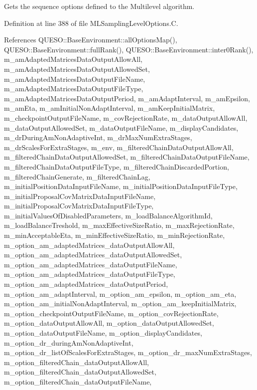 Gets the sequence options defined to the Multilevel algorithm. 



Definition at line 388 of file M\-L\-Sampling\-Level\-Options.\-C.



References Q\-U\-E\-S\-O\-::\-Base\-Environment\-::all\-Options\-Map(), Q\-U\-E\-S\-O\-::\-Base\-Environment\-::full\-Rank(), Q\-U\-E\-S\-O\-::\-Base\-Environment\-::inter0\-Rank(), m\-\_\-am\-Adapted\-Matrices\-Data\-Output\-Allow\-All, m\-\_\-am\-Adapted\-Matrices\-Data\-Output\-Allowed\-Set, m\-\_\-am\-Adapted\-Matrices\-Data\-Output\-File\-Name, m\-\_\-am\-Adapted\-Matrices\-Data\-Output\-File\-Type, m\-\_\-am\-Adapted\-Matrices\-Data\-Output\-Period, m\-\_\-am\-Adapt\-Interval, m\-\_\-am\-Epsilon, m\-\_\-am\-Eta, m\-\_\-am\-Initial\-Non\-Adapt\-Interval, m\-\_\-am\-Keep\-Initial\-Matrix, m\-\_\-checkpoint\-Output\-File\-Name, m\-\_\-cov\-Rejection\-Rate, m\-\_\-data\-Output\-Allow\-All, m\-\_\-data\-Output\-Allowed\-Set, m\-\_\-data\-Output\-File\-Name, m\-\_\-display\-Candidates, m\-\_\-dr\-During\-Am\-Non\-Adaptive\-Int, m\-\_\-dr\-Max\-Num\-Extra\-Stages, m\-\_\-dr\-Scales\-For\-Extra\-Stages, m\-\_\-env, m\-\_\-filtered\-Chain\-Data\-Output\-Allow\-All, m\-\_\-filtered\-Chain\-Data\-Output\-Allowed\-Set, m\-\_\-filtered\-Chain\-Data\-Output\-File\-Name, m\-\_\-filtered\-Chain\-Data\-Output\-File\-Type, m\-\_\-filtered\-Chain\-Discarded\-Portion, m\-\_\-filtered\-Chain\-Generate, m\-\_\-filtered\-Chain\-Lag, m\-\_\-initial\-Position\-Data\-Input\-File\-Name, m\-\_\-initial\-Position\-Data\-Input\-File\-Type, m\-\_\-initial\-Proposal\-Cov\-Matrix\-Data\-Input\-File\-Name, m\-\_\-initial\-Proposal\-Cov\-Matrix\-Data\-Input\-File\-Type, m\-\_\-initial\-Values\-Of\-Disabled\-Parameters, m\-\_\-load\-Balance\-Algorithm\-Id, m\-\_\-load\-Balance\-Treshold, m\-\_\-max\-Effective\-Size\-Ratio, m\-\_\-max\-Rejection\-Rate, m\-\_\-min\-Acceptable\-Eta, m\-\_\-min\-Effective\-Size\-Ratio, m\-\_\-min\-Rejection\-Rate, m\-\_\-option\-\_\-am\-\_\-adapted\-Matrices\-\_\-data\-Output\-Allow\-All, m\-\_\-option\-\_\-am\-\_\-adapted\-Matrices\-\_\-data\-Output\-Allowed\-Set, m\-\_\-option\-\_\-am\-\_\-adapted\-Matrices\-\_\-data\-Output\-File\-Name, m\-\_\-option\-\_\-am\-\_\-adapted\-Matrices\-\_\-data\-Output\-File\-Type, m\-\_\-option\-\_\-am\-\_\-adapted\-Matrices\-\_\-data\-Output\-Period, m\-\_\-option\-\_\-am\-\_\-adapt\-Interval, m\-\_\-option\-\_\-am\-\_\-epsilon, m\-\_\-option\-\_\-am\-\_\-eta, m\-\_\-option\-\_\-am\-\_\-initial\-Non\-Adapt\-Interval, m\-\_\-option\-\_\-am\-\_\-keep\-Initial\-Matrix, m\-\_\-option\-\_\-checkpoint\-Output\-File\-Name, m\-\_\-option\-\_\-cov\-Rejection\-Rate, m\-\_\-option\-\_\-data\-Output\-Allow\-All, m\-\_\-option\-\_\-data\-Output\-Allowed\-Set, m\-\_\-option\-\_\-data\-Output\-File\-Name, m\-\_\-option\-\_\-display\-Candidates, m\-\_\-option\-\_\-dr\-\_\-during\-Am\-Non\-Adaptive\-Int, m\-\_\-option\-\_\-dr\-\_\-list\-Of\-Scales\-For\-Extra\-Stages, m\-\_\-option\-\_\-dr\-\_\-max\-Num\-Extra\-Stages, m\-\_\-option\-\_\-filtered\-Chain\-\_\-data\-Output\-Allow\-All, m\-\_\-option\-\_\-filtered\-Chain\-\_\-data\-Output\-Allowed\-Set, m\-\_\-option\-\_\-filtered\-Chain\-\_\-data\-Output\-File\-Name, 